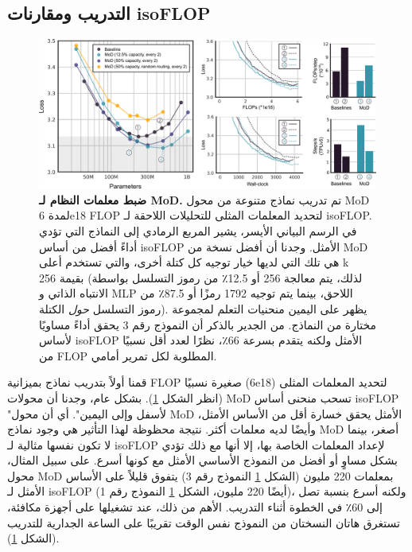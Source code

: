 \documentclass[11pt, a4paper, onecolumn, logo, copyright]{googledeepmind}
\begin{document}
\subsection{التدريب ومقارنات isoFLOP}
\begin{figure}[h]
\centering
\includegraphics[width=\textwidth]{results-1.png}
\caption{\textbf{ضبط معلمات النظام لـ MoD.} تم تدريب نماذج متنوعة من محول MoD لمدة 6e18 FLOP لتحديد المعلمات المثلى للتحليلات اللاحقة لـ isoFLOP. في الرسم البياني الأيسر، يشير المربع الرمادي إلى النماذج التي تؤدي أداءً أفضل من أساس isoFLOP الأمثل. وجدنا أن أفضل نسخة من MoD هي تلك التي لديها خيار توجيه كل كتلة أخرى، والتي تستخدم أعلى k بقيمة 256 (لذلك، يتم معالجة 256 أو 12.5٪ من رموز التسلسل بواسطة الانتباه الذاتي و MLP اللاحق، بينما يتم توجيه 1792 رمزًا أو 87.5٪ من رموز التسلسل \emph{حول} الكتلة). يظهر على اليمين منحنيات التعلم لمجموعة مختارة من النماذج. من الجدير بالذكر أن النموذج رقم 3 يحقق أداءً مساويًا لأساس isoFLOP الأمثل ولكنه يتقدم بسرعة 66٪، نظرًا لعدد أقل نسبيًا من FLOP المطلوبة لكل تمرير أمامي.}
\label{fig:mod-learning-curve}
\end{figure}

قمنا أولاً بتدريب نماذج بميزانية FLOP صغيرة نسبيًا (6e18) لتحديد المعلمات المثلى (انظر الشكل \ref{fig:mod-learning-curve}). بشكل عام، وجدنا أن محولات MoD تسحب منحنى أساس isoFLOP "لأسفل وإلى اليمين". أي أن محول MoD الأمثل يحقق خسارة أقل من الأساس الأمثل، وأيضًا لديه معلمات أكثر. نتيجة محظوظة لهذا التأثير هي وجود نماذج MoD أصغر، بينما لا تكون نفسها مثالية لـ isoFLOP لإعداد المعلمات الخاصة بها، إلا أنها مع ذلك تؤدي بشكل مساوٍ أو أفضل من النموذج الأساسي الأمثل مع كونها أسرع. على سبيل المثال، محول MoD بمعلمات 220 مليون (الشكل \ref{fig:mod-learning-curve} النموذج رقم 3) يتفوق قليلاً على الأساس الأمثل لـ isoFLOP (أيضًا 220 مليون، الشكل \ref{fig:mod-learning-curve} النموذج رقم 1)، ولكنه أسرع بنسبة تصل إلى 60٪ في الخطوة أثناء التدريب. الأهم من ذلك، عند تشغيلها على أجهزة مكافئة، تستغرق هاتان النسختان من النموذج نفس الوقت تقريبًا على الساعة الجدارية للتدريب (الشكل \ref{fig:mod-learning-curve}).
\end{document}
